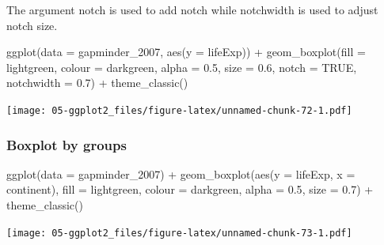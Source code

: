 \documentclass[
]{book}
\newenvironment{Shaded}{\begin{snugshade}}{\end{snugshade}}
\newcommand{\AttributeTok}[1]{\textcolor[rgb]{0.77,0.63,0.00}{#1}}
\newcommand{\ConstantTok}[1]{\textcolor[rgb]{0.00,0.00,0.00}{#1}}
\newcommand{\FloatTok}[1]{\textcolor[rgb]{0.00,0.00,0.81}{#1}}
\newcommand{\FunctionTok}[1]{\textcolor[rgb]{0.00,0.00,0.00}{#1}}
\newcommand{\NormalTok}[1]{#1}
\newcommand{\SpecialCharTok}[1]{\textcolor[rgb]{0.00,0.00,0.00}{#1}}
\newcommand{\StringTok}[1]{\textcolor[rgb]{0.31,0.60,0.02}{#1}}
\begin{document}
The argument notch is used to add notch while notchwidth is used to adjust notch size.

\begin{Shaded}
\begin{Highlighting}[]
\FunctionTok{ggplot}\NormalTok{(}\AttributeTok{data =}\NormalTok{ gapminder\_2007, }\FunctionTok{aes}\NormalTok{(}\AttributeTok{y =}\NormalTok{ lifeExp)) }\SpecialCharTok{+} 
   \FunctionTok{geom\_boxplot}\NormalTok{(}\AttributeTok{fill =} \StringTok{\textquotesingle{}lightgreen\textquotesingle{}}\NormalTok{, }
                \AttributeTok{colour =} \StringTok{\textquotesingle{}darkgreen\textquotesingle{}}\NormalTok{, }
                \AttributeTok{alpha =} \FloatTok{0.5}\NormalTok{,}
                \AttributeTok{size =} \FloatTok{0.6}\NormalTok{,}
                \AttributeTok{notch =} \ConstantTok{TRUE}\NormalTok{, }
                \AttributeTok{notchwidth =} \FloatTok{0.7}\NormalTok{) }\SpecialCharTok{+}
   \FunctionTok{theme\_classic}\NormalTok{()}
\end{Highlighting}
\end{Shaded}

\texttt{[image: 05-ggplot2\_files/figure-latex/unnamed-chunk-72-1.pdf]}

\hypertarget{boxplot-by-groups}{%
\subsubsection{Boxplot by groups}\label{boxplot-by-groups}}

\begin{Shaded}
\begin{Highlighting}[]
\FunctionTok{ggplot}\NormalTok{(}\AttributeTok{data =}\NormalTok{ gapminder\_2007) }\SpecialCharTok{+} 
   \FunctionTok{geom\_boxplot}\NormalTok{(}\FunctionTok{aes}\NormalTok{(}\AttributeTok{y =}\NormalTok{ lifeExp, }\AttributeTok{x =}\NormalTok{ continent), }
                \AttributeTok{fill =} \StringTok{\textquotesingle{}lightgreen\textquotesingle{}}\NormalTok{, }
                \AttributeTok{colour =} \StringTok{\textquotesingle{}darkgreen\textquotesingle{}}\NormalTok{,}
                \AttributeTok{alpha =} \FloatTok{0.5}\NormalTok{,}
                \AttributeTok{size =} \FloatTok{0.7}\NormalTok{) }\SpecialCharTok{+}
   \FunctionTok{theme\_classic}\NormalTok{()}
\end{Highlighting}
\end{Shaded}

\texttt{[image: 05-ggplot2\_files/figure-latex/unnamed-chunk-73-1.pdf]}
\end{document}
